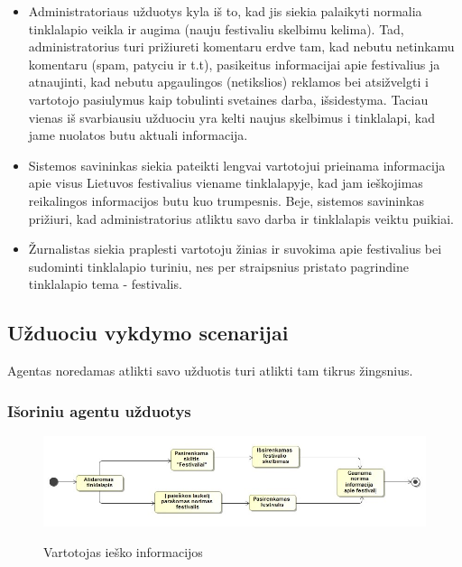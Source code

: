 ﻿\documentclass{VUMIFPSkursinis}
\begin{document}
\begin{itemize}
\item Administratoriaus užduotys kyla iš to, kad jis siekia palaikyti normalia tinklalapio veikla ir augima (nauju festivaliu skelbimu kelima). Tad, administratorius turi prižiureti komentaru erdve tam, kad nebutu netinkamu komentaru (spam, patyciu ir t.t), pasikeitus informacijai apie festivalius ja atnaujinti, kad nebutu apgaulingos (netikslios) reklamos bei atsižvelgti i vartotojo pasiulymus kaip tobulinti svetaines darba, išsidestyma. Taciau vienas iš svarbiausiu užduociu yra kelti naujus skelbimus i tinklalapi, kad jame nuolatos butu aktuali informacija.
\item Sistemos savininkas siekia pateikti lengvai vartotojui prieinama informacija apie visus Lietuvos festivalius viename tinklalapyje, kad jam ieškojimas reikalingos informacijos butu kuo trumpesnis. Beje, sistemos savininkas prižiuri, kad administratorius atliktu savo darba ir tinklalapis veiktu puikiai.
\item Žurnalistas siekia praplesti vartotoju žinias ir suvokima apie festivalius bei sudominti tinklalapio turiniu, nes per straipsnius pristato pagrindine tinklalapio tema - festivalis.
\end{itemize}

\subsection {Užduociu vykdymo scenarijai}

Agentas noredamas atlikti savo užduotis turi atlikti tam tikrus žingsnius.

\subsubsection{Išoriniu agentu užduotys} 
\begin{figure}[H]
    \centering
    \includegraphics[scale=0.55]{img/geri/klientasInfo}
    \label{img:uml3_5}
	\caption{Vartotojas ieško informacijos}
\end{figure}
\end{document}
